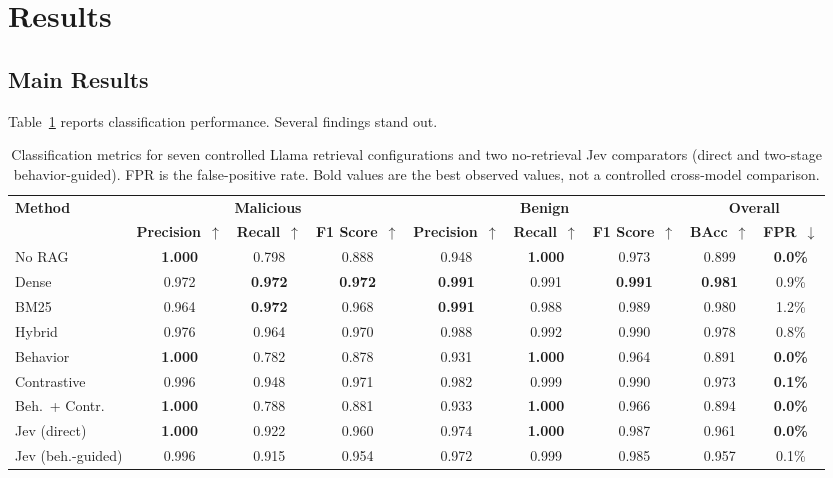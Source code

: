 \section{Results}
\label{sec:results}

\subsection{Main Results}
\label{sec:main-results}

Table~\ref{tab:main-results} reports classification performance. Several
findings stand out.

\begin{table}[!ht]
    \caption{Classification metrics for seven controlled Llama retrieval
    configurations and two no-retrieval Jev comparators (direct and two-stage
    behavior-guided). FPR is the false-positive rate. Bold values are the best
    observed values, not a controlled cross-model comparison.}
    \label{tab:main-results}
    \centering
    \begin{tabular}{lccc|ccc|cc}
        \toprule
        \textbf{Method} & \multicolumn{3}{c}{\textbf{Malicious}} & \multicolumn{3}{c}{\textbf{Benign}} & \multicolumn{2}{c}{\textbf{Overall}} \\
        \cmidrule(lr){2-4}\cmidrule(lr){5-7}\cmidrule(lr){8-9}
        & \textbf{Precision}~$\uparrow$ & \textbf{Recall}~$\uparrow$ & \textbf{F1 Score}~$\uparrow$ & \textbf{Precision}~$\uparrow$ & \textbf{Recall}~$\uparrow$ & \textbf{F1 Score}~$\uparrow$ & \textbf{BAcc}~$\uparrow$ & \textbf{FPR}~$\downarrow$ \\
        \midrule
        No RAG           & \textbf{1.000} & 0.798 & 0.888 & 0.948 & \textbf{1.000} & 0.973 & 0.899 & \textbf{0.0\%} \\
        Dense            & 0.972 & \textbf{0.972} & \textbf{0.972} & \textbf{0.991} & 0.991 & \textbf{0.991} & \textbf{0.981} & 0.9\% \\
        BM25             & 0.964 & \textbf{0.972} & 0.968 & \textbf{0.991} & 0.988 & 0.989 & 0.980 & 1.2\% \\
        Hybrid           & 0.976 & 0.964 & 0.970 & 0.988 & 0.992 & 0.990 & 0.978 & 0.8\% \\
        Behavior         & \textbf{1.000} & 0.782 & 0.878 & 0.931 & \textbf{1.000} & 0.964 & 0.891 & \textbf{0.0\%} \\
        Contrastive      & 0.996 & 0.948 & 0.971 & 0.982 & 0.999 & 0.990 & 0.973 & \textbf{0.1\%} \\
        Beh.\ + Contr.   & \textbf{1.000} & 0.788 & 0.881 & 0.933 & \textbf{1.000} & 0.966 & 0.894 & \textbf{0.0\%} \\
        \midrule
        Jev (direct)     & \textbf{1.000} & 0.922 & 0.960 & 0.974 & \textbf{1.000} & 0.987 & 0.961 & \textbf{0.0\%} \\
        Jev (beh.-guided)& 0.996 & 0.915 & 0.954 & 0.972 & 0.999 & 0.985 & 0.957 & 0.1\% \\
        \bottomrule
    \end{tabular}
\end{table}

